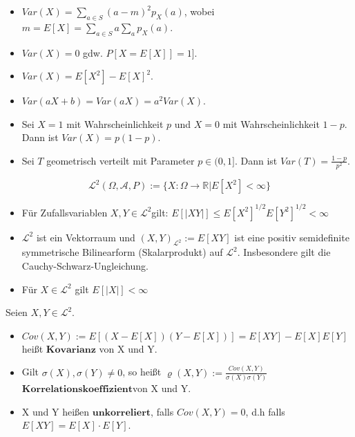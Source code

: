 \begin{bemerkung}
\begin{itemize}
\item $Var(X)=\sum_{a\in S}(a-m)^{2}p_{X}(a)$, wobei $m=E[X]=\sum_{a\in S}a\sum_{a}p_{X}(a)$.
\item $Var(X)=0$ gdw. $P[X=E[X]]=1${]}.
\item $Var(X)=E[X^{2}]-E[X]^{2}$.
\item $Var(aX+b)=Var(aX)=a^{2}Var(X)$.
\end{itemize}
\end{bemerkung}
\begin{beispiel}
\begin{itemize}
\item Sei $X=1$ mit Wahrscheinlichkeit $p$ und $X=0$ mit Wahrscheinlichkeit
$1-p$. Dann ist $Var(X)=p(1-p)$.
\item Sei $T$ geometrisch verteilt mit Parameter $p\in(0,1].$ Dann ist
$Var(T)=\frac{1-p}{p^{2}}$.
\end{itemize}
\end{beispiel}
\begin{definition}

\[
\mathcal{L}^{2}(\Omega,\mathcal{A},P):=\{X:\Omega\rightarrow\mathbb{R}|E[X^{2}]<\infty\}
\]

\end{definition}
\begin{lemma} 
\begin{itemize}
\item F\"ur Zufallsvariablen $X,Y\in\mathcal{L}^{2}$gilt: $E[|XY|]\leq E[X^{2}]^{1/2}E[Y^{2}]^{1/2}<\infty$
\item $\mathcal{L}^{2}$ ist ein Vektorraum und $(X,Y)_{\mathcal{L}^{2}}:=E[XY]$
ist eine positiv semidefinite symmetrische Bilinearform (Skalarprodukt)
auf $\mathcal{L}^{2}$. Insbesondere gilt die Cauchy-Schwarz-Ungleichung.
\item F\"ur $X\in\mathcal{L}^{2}$ gilt $E[|X|]<\infty$
\end{itemize}
\end{lemma}
\begin{definition}

Seien $X,Y\in\mathcal{L}^{2}$.
\begin{itemize}
\item $Cov(X,Y):=E[(X-E[X])(Y-E[X])]=E[XY]-E[X]E[Y]$ hei\ss t $\mathbf{Kovarianz}$
von X und Y.
\item Gilt $\sigma(X),\sigma(Y)\neq0$, so hei\ss t $\varrho(X,Y):=\frac{Cov(X,Y)}{\sigma(X)\sigma(Y)}$
$\mathbf{Korrelationskoeffizient}$von X und Y.
\item X und Y hei\ss en $\mathbf{unkorreliert}$, falls $Cov(X,Y)=0$, d.h
falls $E[XY]=E[X]\cdot E[Y]$.
\end{itemize}
\end{definition}
